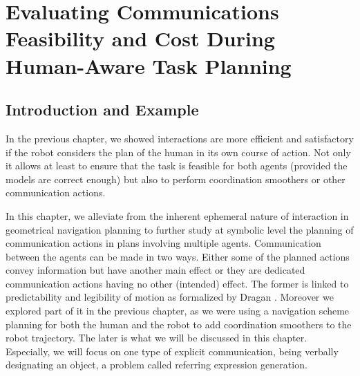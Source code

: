 \documentclass[a4paper,11pt,twoside]{StyleThese}
\begin{document}
\setcounter{chapter}{2} %
\dominitoc
\faketableofcontents
\fi

\chapter{Evaluating Communications Feasibility and Cost During Human-Aware Task Planning}
\label{chapter:comm}
\minitoc

\section{Introduction and Example}
In the previous chapter, we showed interactions are more efficient and satisfactory if the robot considers the plan of the human in its own course of action. Not only it allows at least to ensure that the task is feasible for both agents (provided the models are correct enough) but also to perform coordination smoothers or other communication actions.

In this chapter, we alleviate from the inherent ephemeral nature of interaction in geometrical navigation planning to further study at symbolic level the planning of communication actions in plans involving multiple agents. Communication between the agents can be made in two ways. Either some of the planned actions convey information but have another main effect or they are dedicated communication actions having no other (intended) effect. The former is linked to predictability and legibility of motion as formalized by Dragan \cite{dragan_legibility_2013}. Moreover we explored part of it in the previous chapter, as we were using a navigation scheme planning for both the human and the robot to add coordination smoothers to the robot trajectory. The later is what we will be discussed in this chapter. Especially, we will focus on one type of explicit communication, being verbally designating an object, a problem called referring expression generation.
\end{document}
